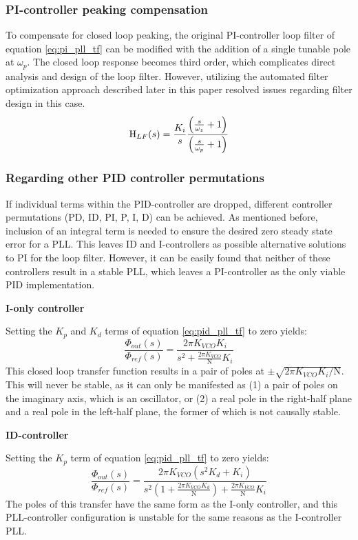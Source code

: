 		\subsubsection{PI-controller peaking compensation}
			 To compensate for closed loop peaking, the original PI-controller loop filter of equation \ref{eq:pi_pll_tf} can be modified with the addition of a single tunable pole at $\omega_p$. The closed loop response becomes third order, which complicates direct analysis and design of the loop filter. However, utilizing the automated filter optimization approach described later in this paper resolved issues regarding filter design in this case.
			\begin{equation} \label{eq:pi_compensated_tf}
				\textnormal{H}_{LF}(s) = \frac{K_i}{s}\frac{\left(\frac{s}{\omega_z} + 1\right)}{\left(\frac{s}{\omega_p} + 1\right)}
			\end{equation}

		\subsubsection{Regarding other PID controller permutations} \label{other_pid}
			If individual terms within the PID-controller are dropped, different controller permutations (PD, ID, PI, P, I, D) can be achieved. As mentioned before, inclusion of an integral term is needed to ensure the desired zero steady state error for a PLL. This leaves ID and I-controllers as possible alternative solutions to PI for the loop filter. However, it can be easily found that neither of these controllers result in a stable PLL, which leaves a PI-controller as the only viable PID implementation.

			\textbf{I-only controller}

			Setting the $K_p$ and $K_d$ terms of equation \ref{eq:pid_pll_tf} to zero yields:
			\begin{equation}
				\frac{\Phi_{out}(s)}{\Phi_{ref}(s)} = \frac{2\pi K_{VCO}K_i}{s^2 + \frac{2\pi K_{VCO}}{\mathrm{N}}K_i}
			\end{equation}
			This closed loop transfer function results in a pair of poles at $\pm\sqrt{2\pi K_{VCO}K_i/\mathrm{N}}$. This will never be stable, as it can only be manifested as (1) a pair of poles on the imaginary axis, which is an oscillator, or (2) a real pole in the right-half plane and a real pole in the left-half plane, the former of which is not causally stable.

			\textbf{ID-controller}

			Setting the $K_p$ term of equation \ref{eq:pid_pll_tf} to zero yields:
			\begin{equation}
				\frac{\Phi_{out}(s)}{\Phi_{ref}(s)} = \frac{2\pi K_{VCO}\left(s^2K_d + K_i\right)}{s^2\left(1 + \frac{2\pi K_{VCO}K_d}{\mathrm{N}}\right) + \frac{2\pi K_{VCO}}{\mathrm{N}} K_i}
			\end{equation}
			The poles of this transfer have the same form as the I-only controller, and this PLL-controller configuration is unstable for the same reasons as the I-controller PLL.